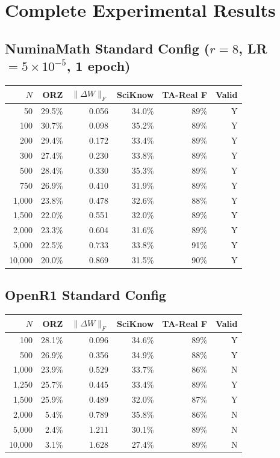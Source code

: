 \documentclass{article}
\begin{document}
\newpage
\appendix
\section{Complete Experimental Results}
\label{app:results}

\subsection{NuminaMath Standard Config ($r{=}8$, LR$=5{\times}10^{-5}$, 1 epoch)}

\begin{table}[h]
\centering
\small
\begin{tabular}{@{}rrrrrr@{}}
\toprule
$N$ & ORZ & $\|\Delta W\|_F$ & SciKnow & TA-Real F & Valid \\
\midrule
50 & 29.5\% & 0.056 & 34.0\% & 89\% & Y \\
100 & 30.7\% & 0.098 & 35.2\% & 89\% & Y \\
200 & 29.4\% & 0.172 & 33.4\% & 89\% & Y \\
300 & 27.4\% & 0.230 & 33.8\% & 89\% & Y \\
500 & 28.4\% & 0.330 & 35.3\% & 89\% & Y \\
750 & 26.9\% & 0.410 & 31.9\% & 89\% & Y \\
1,000 & 23.8\% & 0.478 & 32.6\% & 88\% & Y \\
1,500 & 22.0\% & 0.551 & 32.0\% & 89\% & Y \\
2,000 & 23.3\% & 0.604 & 31.6\% & 89\% & Y \\
5,000 & 22.5\% & 0.733 & 33.8\% & 91\% & Y \\
10,000 & 20.0\% & 0.869 & 31.5\% & 90\% & Y \\
\bottomrule
\end{tabular}
\end{table}

\subsection{OpenR1 Standard Config}

\begin{table}[h]
\centering
\small
\begin{tabular}{@{}rrrrrr@{}}
\toprule
$N$ & ORZ & $\|\Delta W\|_F$ & SciKnow & TA-Real F & Valid \\
\midrule
100 & 28.1\% & 0.096 & 34.6\% & 89\% & Y \\
500 & 26.9\% & 0.356 & 34.9\% & 88\% & Y \\
1,000 & 23.9\% & 0.529 & 33.7\% & 86\% & N \\
1,250 & 25.7\% & 0.445 & 33.4\% & 89\% & Y \\
1,500 & 25.9\% & 0.489 & 32.0\% & 87\% & Y \\
2,000 & 5.4\% & 0.789 & 35.8\% & 86\% & N \\
5,000 & 2.4\% & 1.211 & 30.1\% & 89\% & N \\
10,000 & 3.1\% & 1.628 & 27.4\% & 89\% & N \\
\bottomrule
\end{tabular}
\end{table}
\end{document}
